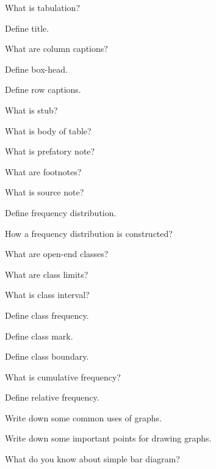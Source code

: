 \documentclass[11pt,a4paper]{article}
\begin{document}
\begin{shortlist}
\item What is tabulation?

\item Define title.

\item What are column captions?

\item Define box-head.

\item Define row captions.

\item What is stub?

\item What is body of table?

\item What is prefatory note?

\item What are footnotes?

\item What is source note?

\item Define frequency distribution.

\item How a frequency distribution is constructed?

\item What are open-end classes?

\item What are class limits?

\item What is class interval?

\item Define class frequency.

\item Define class mark.

\item Define class boundary.

\item What is cumulative frequency?

\item Define relative frequency.

\item Write down some common uses of graphs.

\item Write down some important points for drawing graphs.

\item What do you know about simple bar diagram?


\end{shortlist}
\end{document}
